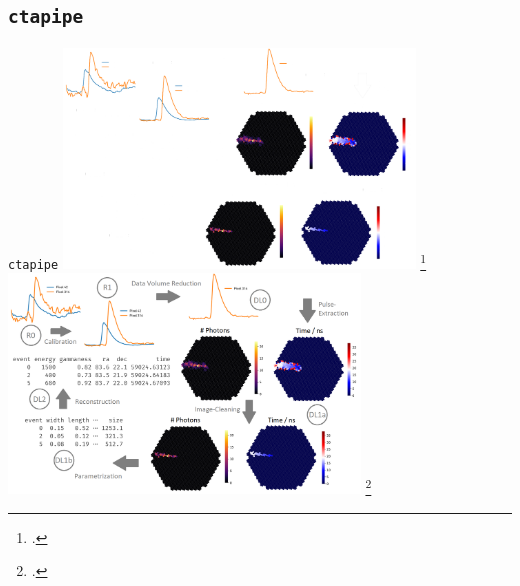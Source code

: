 \subsection{\texttt{ctapipe}}
\begin{frame}{\texttt{ctapipe}}
  \centering
  \ifdefined\darktheme
    \includegraphics[width=0.7\textwidth]{graphics/ctapipe_darktheme.png}
    \footcite{hackfeld}
  \else
    \includegraphics[width=0.7\textwidth]{graphics/ctapipe.png}
    \footcite{hackfeld}
  \fi
\end{frame}
\begin{frame}
  \printbibliography
\end{frame}